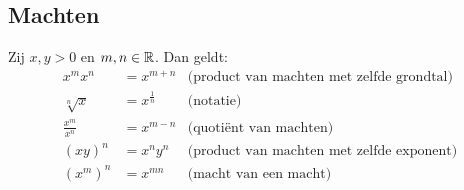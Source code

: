 \documentclass{ximera}
\begin{document}
\begin{proposition}
	
\subsection{Machten}
Zij $x,y>0$ en $m,n\in\mathbb R$. Dan geldt:
\begin{align*}
	x^{m}x^{n}          &= x^{m+n}     & \text{(product van machten met zelfde grondtal)}\\
	\sqrt[n] x          &= x^{\frac1n}  & \text{(notatie)}\\
	\frac{x^{m}}{x^{n}} &= x^{m-n}      & \text{(quotiënt van machten)} \\
	(xy)^n              &= x^ny^n      & \text{(product van machten met zelfde exponent)}\\
	\left(x^{m}\right)^{n}&= x^{mn}    & \text{(macht van een macht)}\\	
\end{align*}
\end{proposition}
\end{document}
